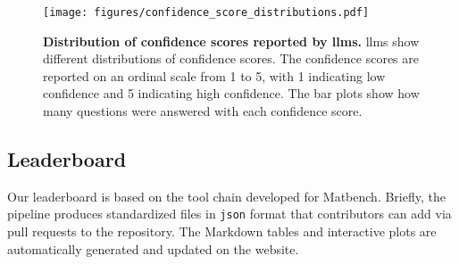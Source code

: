 \begin{figure}[htb] 
    \centering
    \texttt{[image: figures/confidence\_score\_distributions.pdf]}
    \caption{\textbf{Distribution of confidence scores reported by \glspl{llm}.} \Glspl{llm} show different distributions of confidence scores. The confidence scores are reported on an ordinal scale from 1 to 5, with 1 indicating low confidence and 5 indicating high confidence. The bar plots show how many questions were answered with each confidence score.}
    \label{fig:confidence_score_distributions}
\end{figure}


\subsection{Leaderboard}
Our leaderboard is based on the tool chain developed for Matbench.\autocite{Dunn_2020} 
Briefly, the \chembench pipeline produces standardized files in \texttt{json} format that contributors can add via pull requests to the \chembench repository.
The Markdown tables and interactive plots are automatically generated and updated on the \chembench website.

\clearpage

\printnoidxglossary[type=\acronymtype, nonumberlist]  %